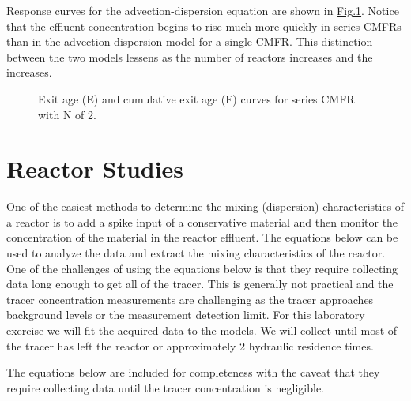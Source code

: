 \documentclass[letterpaper,10pt,english]{sphinxmanual}
\let\sphinxpxdimen\pdfpxdimen\else\newdimen\sphinxpxdimen
\begin{document}
Response curves for the advection-dispersion equation are shown in \hyperref[\detokenize{Reactor_Characteristics/Reactor_Characteristics:figure-e-f-n-2}]{Fig.\@ \ref{\detokenize{Reactor_Characteristics/Reactor_Characteristics:figure-e-f-n-2}}}. Notice that the effluent concentration begins to rise much more quickly in series CMFRs than in the advection-dispersion model for a single CMFR. This distinction between the two models lessens as the number of reactors increases and the  increases.

\begin{figure}[htbp]
\centering
\capstart

\noindent\sphinxincludegraphics[width=300\sphinxpxdimen]{{E_F_N_2}.png}
\caption{Exit age (E) and cumulative exit age (F) curves for series CMFR with N of 2.}\label{\detokenize{Reactor_Characteristics/Reactor_Characteristics:id7}}\label{\detokenize{Reactor_Characteristics/Reactor_Characteristics:figure-e-f-n-2}}\end{figure}


\section{Reactor Studies}
\label{\detokenize{Reactor_Characteristics/Reactor_Characteristics:reactor-studies}}\label{\detokenize{Reactor_Characteristics/Reactor_Characteristics:heading-reactor-studies}}
One of the easiest methods to determine the mixing (dispersion) characteristics of a reactor is to add a spike input of a conservative material and then monitor the concentration of the material in the reactor effluent. The equations below can be used to analyze the data and extract the mixing characteristics of the reactor. One of the challenges of using the equations below is that they require collecting data long enough to get all of the tracer. This is generally not practical and the tracer concentration measurements are challenging as the tracer approaches background levels or the measurement detection limit. For this laboratory exercise we will fit the acquired data to the models. We will collect until most of the tracer has left the reactor or approximately 2 hydraulic residence times.

The equations below are included for completeness with the caveat that they require collecting data until the tracer concentration is negligible.
\end{document}
